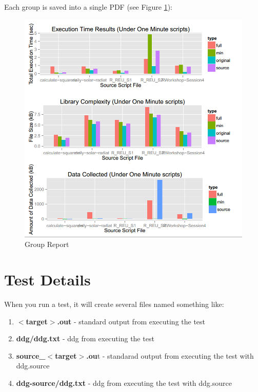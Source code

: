 \documentclass[12pt]{article}
\begin{document}
\begin{enumerate}
Each group is saved into a single PDF (see Figure \ref{fig:group_report}):
\begin{figure}[!ht]
\caption{Group Report}
\begin{center}
\includegraphics[scale=0.5]{UsingRDataTrackerTests-img/report-group-example.PNG}
\end{center}
\label{fig:group_report}
\end{figure}
\end{enumerate}



\section{Test Details}
\label{section:test_details}
When you run a test, it will create several files named something like:

\begin{enumerate}
\item \textbf{$<$target$>$.out} - standard output from executing the test
\item \textbf{ddg/ddg.txt} - ddg from executing the test
\item \textbf{source\_$<$target$>$.ou}t - standarad output from executing the test with ddg.source
\item \textbf{ddg-source/ddg.txt} - ddg from executing the test with ddg.source
\end{enumerate}
\end{document}
